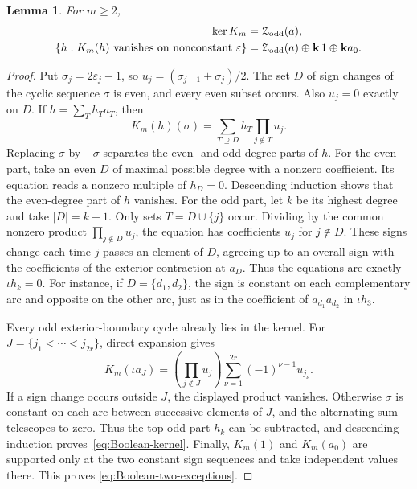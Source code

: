 \documentclass[reqno]{article}
\theoremstyle{plain} %
\newtheorem{lemma}[theorem]{Lemma}
\theoremstyle{definition}
\theoremstyle{remark}
\newcommand{\K} {\mathbf{k}}
\numberwithin{equation}{section}
\begin{document}
\begin{lemma}\label{lem:Boolean-closing-kernel}
For $m\ge2$,
\begin{align}
\ker K_m&=\mathcal Z_{\rm odd}(a),\label{eq:Boolean-kernel}\\
\{h:K_m(h)\text{ vanishes on nonconstant }\varepsilon\}
 &=\mathcal Z_{\rm odd}(a)\oplus\K\,1\oplus\K a_0.
\label{eq:Boolean-two-exceptions}
\end{align}
\end{lemma}
\begin{proof}
Put $\sigma_j=2\varepsilon_j-1$, so $u_j=(\sigma_{j-1}+\sigma_j)/2$. The set $D$ of sign changes
of the cyclic sequence $\sigma$ is even, and every even subset occurs.
Also $u_j=0$ exactly on $D$. If $h=\sum_T h_Ta_T$, then
\[
K_m(h)(\sigma)=\sum_{T\supseteq D}h_T\prod_{j\notin T}u_j.
\]
Replacing $\sigma$ by $-\sigma$ separates the even- and odd-degree
parts of $h$. For the even part, take an even $D$ of maximal possible
degree with a nonzero coefficient. Its equation reads a nonzero multiple
of $h_D=0$. Descending induction shows that the even-degree part of
$h$ vanishes.
For the odd part, let $k$ be its highest degree and take $|D|=k-1$.
Only sets $T=D\cup\{j\}$ occur. Dividing by the common nonzero
product $\prod_{j\notin D}u_j$, the equation has coefficients $u_j$
for $j\notin D$. These signs change each time $j$ passes an element of
$D$, agreeing up to an overall sign with the coefficients of the
exterior contraction at $a_D$. Thus the equations are exactly
$\iota h_k=0$. For instance, if $D=\{d_1,d_2\}$, the sign is constant
on each complementary arc and opposite on the other arc, just as in
the coefficient of $a_{d_1}a_{d_2}$ in $\iota h_3$.

Every odd exterior-boundary cycle already lies in the kernel.
For $J=\{j_1<\cdots<j_{2r}\}$, direct expansion gives
\[
K_m(\iota a_J)
=\left(\prod_{j\notin J}u_j\right)
  \sum_{\nu=1}^{2r}(-1)^{\nu-1}u_{j_\nu}.
\]
If a sign change occurs outside $J$, the displayed product vanishes.
Otherwise $\sigma$ is
constant on each arc between successive elements of $J$, and the
alternating sum telescopes to zero. Thus the top odd part $h_k$ can be
subtracted, and descending induction proves~\eqref{eq:Boolean-kernel}.
Finally, $K_m(1)$ and $K_m(a_0)$ are supported only at the two constant
sign sequences and take independent values there. This proves
\eqref{eq:Boolean-two-exceptions}.
\end{proof}
\end{document}
